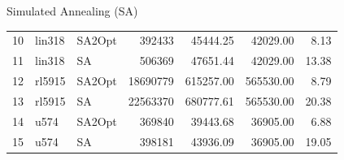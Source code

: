 \documentclass{beamer}
\begin{document}
\begin{frame}{Simulated Annealing (SA)}
\begin{table}[H]
\begin{tabular}{lllrrrr}
            10 & lin318   & SA2Opt    & 392433     & 45444.25       & 42029.00         & 8.13  \\
            11 & lin318   & SA        & 506369     & 47651.44       & 42029.00         & 13.38 \\
            12 & rl5915   & SA2Opt    & 18690779   & 615257.00      & 565530.00        & 8.79  \\
            13 & rl5915   & SA        & 22563370   & 680777.61      & 565530.00        & 20.38 \\
            14 & u574     & SA2Opt    & 369840     & 39443.68       & 36905.00         & 6.88  \\
            15 & u574     & SA        & 398181     & 43936.09       & 36905.00         & 19.05 \\
            \bottomrule
        \end{tabular}
    \end{table}
\end{frame}
\end{document}
